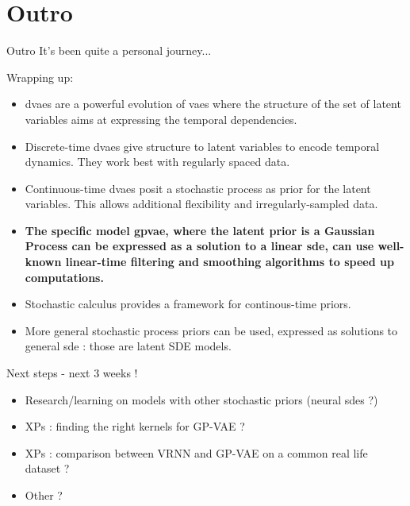 \section{Outro}\label{outro}

\begin{frame}{Outro}
    It's been quite a personal journey...

Wrapping up:

    \begin{itemize}
        \item \glspl{dvae} are a powerful evolution of \glspl{vae} where the structure of the set of latent variables 
        aims at expressing the temporal dependencies.
        \item Discrete-time \glspl{dvae} give structure to latent variables to encode temporal dynamics. They work best with regularly spaced data.
        \item Continuous-time \glspl{dvae} posit a stochastic process as prior for the latent variables. This allows 
        additional flexibility and irregularly-sampled data.
        \item \textbf{The specific model \gls{gpvae}, where the latent prior is a Gaussian Process can be expressed as a 
        solution to a linear \gls{sde}, can use well-known linear-time filtering and smoothing algorithms to speed up 
        computations.}
        \item Stochastic calculus provides a framework for continous-time priors.
        \item More general stochastic process priors can be used, expressed as solutions to general \gls{sde} :
        those are latent SDE models.
    \end{itemize}
\end{frame}

\begin{frame}{Next steps - next 3 weeks !}
    \begin{itemize}
        \item Research/learning on models with other stochastic priors (neural \glspl{sde} ?)
        \item XPs : finding the right kernels for GP-VAE ?
        \item XPs : comparison between VRNN and GP-VAE on a common real life dataset ?
        \item Other ?
    \end{itemize}
\end{frame}